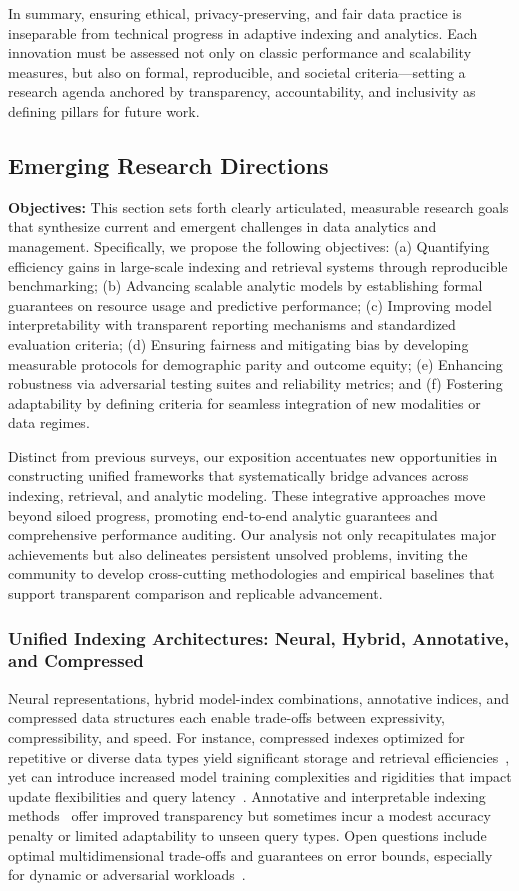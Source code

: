 \documentclass[sigconf]{acmart}
\begin{document}
In summary, ensuring ethical, privacy-preserving, and fair data practice is inseparable from technical progress in adaptive indexing and analytics. Each innovation must be assessed not only on classic performance and scalability measures, but also on formal, reproducible, and societal criteria---setting a research agenda anchored by transparency, accountability, and inclusivity as defining pillars for future work.

\subsection{Emerging Research Directions}

\textbf{Objectives:} This section sets forth clearly articulated, measurable research goals that synthesize current and emergent challenges in data analytics and management. Specifically, we propose the following objectives: (a) Quantifying efficiency gains in large-scale indexing and retrieval systems through reproducible benchmarking; (b) Advancing scalable analytic models by establishing formal guarantees on resource usage and predictive performance; (c) Improving model interpretability with transparent reporting mechanisms and standardized evaluation criteria; (d) Ensuring fairness and mitigating bias by developing measurable protocols for demographic parity and outcome equity; (e) Enhancing robustness via adversarial testing suites and reliability metrics; and (f) Fostering adaptability by defining criteria for seamless integration of new modalities or data regimes. 

Distinct from previous surveys, our exposition accentuates new opportunities in constructing unified frameworks that systematically bridge advances across indexing, retrieval, and analytic modeling. These integrative approaches move beyond siloed progress, promoting end-to-end analytic guarantees and comprehensive performance auditing. Our analysis not only recapitulates major achievements but also delineates persistent unsolved problems, inviting the community to develop cross-cutting methodologies and empirical baselines that support transparent comparison and replicable advancement.

\subsubsection*{Unified Indexing Architectures: Neural, Hybrid, Annotative, and Compressed}
Neural representations, hybrid model-index combinations, annotative indices, and compressed data structures each enable trade-offs between expressivity, compressibility, and speed. For instance, compressed indexes optimized for repetitive or diverse data types yield significant storage and retrieval efficiencies~\cite{ref110,ref111,ref115,ref118}, yet can introduce increased model training complexities and rigidities that impact update flexibilities and query latency~\cite{ref110,ref111}. Annotative and interpretable indexing methods~\cite{ref115} offer improved transparency but sometimes incur a modest accuracy penalty or limited adaptability to unseen query types. Open questions include optimal multidimensional trade-offs and guarantees on error bounds, especially for dynamic or adversarial workloads~\cite{ref110,ref111}.
\end{document}
